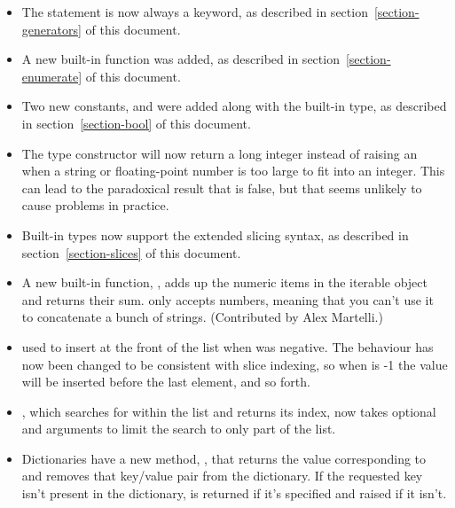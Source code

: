 \documentclass{howto}
\begin{document}
\begin{itemize}
\item The  statement is now always a keyword, as
described in section~\ref{section-generators} of this document.

\item A new built-in function 
was added, as described in section~\ref{section-enumerate} of this
document.

\item Two new constants,  and  were
added along with the built-in  type, as described in
section~\ref{section-bool} of this document.

\item The  type constructor will now return a long
integer instead of raising an  when a string
or floating-point number is too large to fit into an integer.  This
can lead to the paradoxical result that
 is false, but that seems
unlikely to cause problems in practice.

\item Built-in types now support the extended slicing syntax,
as described in section~\ref{section-slices} of this document.

\item A new built-in function, , 
adds up the numeric items in the iterable object and returns their sum. 
 only accepts numbers, meaning that you can't use it
to concatenate a bunch of strings.   (Contributed by Alex
Martelli.)

\item {} used to 
insert  at the front of the list when  was
negative.  The behaviour has now been changed to be consistent with
slice indexing, so when  is -1 the value will be inserted
before the last element, and so forth.

\item {}, which searches for  
within the list and returns its index, now takes optional 
 and  arguments to limit the search to 
only part of the list.

\item Dictionaries have a new method, , that returns the value corresponding to 
and removes that key/value pair from the dictionary.  If the requested
key isn't present in the dictionary,  is returned if it's
specified and  raised if it isn't.


\end{itemize}
\end{document}
